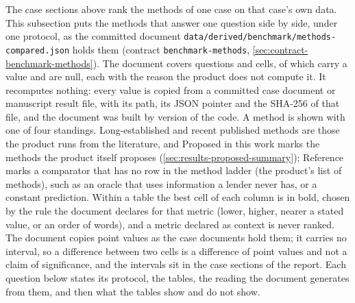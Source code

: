 The case sections above rank the methods of one case on that case's own data. This subsection puts the methods that answer one question side by side, under one protocol, as the committed document \texttt{data/derived/benchmark/methods-compared.json} holds them (contract \texttt{benchmark-methods}, \cref{sec:contract-benchmark-methods}). The document covers \bmNQuestions{} questions and \bmNCells{} cells, of which \bmNFilled{} carry a value and \bmNNull{} are null, each with the reason the product does not compute it. It recomputes nothing: every value is copied from a committed case document or manuscript result file, with its path, its JSON pointer and the SHA-256 of that file, and the document was built by version \bmCodeVersion{} of the code. A method is shown with one of four standings. Long-established and recent published methods are those the product runs from the literature, and Proposed in this work marks the methods the product itself proposes (\cref{sec:results-proposed-summary}); Reference marks a comparator that has no row in the method ladder (the product's list of methods), such as an oracle that uses information a lender never has, or a constant prediction. Within a table the best cell of each column is in bold, chosen by the rule the document declares for that metric (lower, higher, nearer a stated value, or an order of words), and a metric declared as context is never ranked. The document copies point values as the case documents hold them; it carries no interval, so a difference between two cells is a difference of point values and not a claim of significance, and the intervals sit in the case sections of the report. Each question below states its protocol, the tables, the reading the document generates from them, and then what the tables show and do not show.



